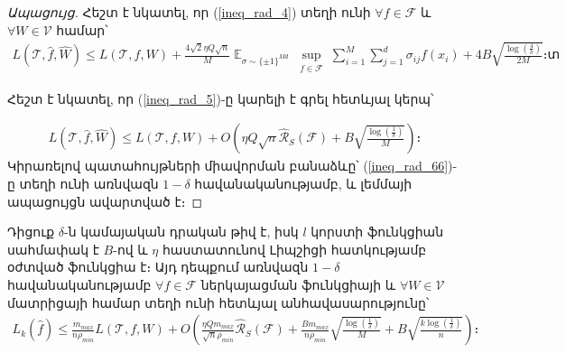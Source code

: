 \documentclass[12pt]{article}
\DeclareMathOperator*{\E}{\mathbb{E}}
\begin{document}
\begin{proof}[Ապացույց]
\noindent Հեշտ է նկատել, որ (\ref{ineq_rad_4}) տեղի ունի  $\forall f \in \mathcal{ F}$ և $\forall W \in \mathcal{V}$ համար՝
\begin{align}
\label{ineq_rad_5}
L(\mathcal{T}, \hat{f}, \hat{W}) \leq  L(\mathcal{T}, f, W) + \frac{4\sqrt{2} \eta Q\sqrt{n}}{M} \E_{\sigma \sim \{\pm1\}^{Md}} \sup_{\substack{ f  \in \mathcal{F}  }}\sum_{i=1}^M \sum_{j=1}^d \sigma_{ij}f(x_i)+    4B\sqrt{\frac{\log \left( \frac{4}{\delta} \right)}{2M}}։տ
\end{align}

 Հեշտ է նկատել, որ (\ref{ineq_rad_5})-ը կարելի է գրել հետևյալ կերպ՝

\begin{align}
\label{ineq_rad_66}
L(\mathcal{T}, \hat{f}, \hat{W}) \leq  L(\mathcal{T}, f, W) + O\left( \eta Q\sqrt{n} \hat{\mathcal{R}}_S(\mathcal{F})+    B\sqrt{\frac{\log \left( \frac{1}{\delta} \right)}{M}} \right)։
\end{align}
Կիրառելով պատահույթների միավորման բանաձևը՝ (\ref{ineq_rad_66})-ը տեղի ունի առնվազն $1-\delta$ հավանականությամբ, և լեմմայի ապացույցն ավարտված է։
\end{proof}



\begin{theorem}
\label{main_theorem}
Դիցուք $\delta$-ն կամայական դրական թիվ է,  իսկ $l$ կորստի ֆունկցիան սահմափակ է $B$-ով և $\eta$ հաստատունով Լիպշիցի հատկությամբ օժտված ֆունկցիա է։ Այդ դեպքում առնվազն $1-\delta$ հավանականությամբ $\forall f \in \mathcal{F}$ ներկայացման ֆունկցիայի և $\forall W \in \mathcal{V}$ մատրիցայի համար տեղի ունի հետևյալ անհավասարությունը՝ 
\begin{align*}
L_k(\hat{f}) \leq  \frac{m_{max}}{n \rho_{min}}  L(\mathcal{T}, f, W)+ O\left(
\frac{\eta Qm_{max}}{\sqrt{n}\rho_{min}} \hat{\mathcal{R}}_S(\mathcal{F})+    \frac{Bm_{max}}{n\rho_{min}}\sqrt{\frac{\log \left( \frac{1}{\delta} \right)}{M}} + B\sqrt{\frac{k\log \left(\frac{1}{\delta}\right) }{n}} \right)։
\end{align*}
\end{theorem}
\end{document}
